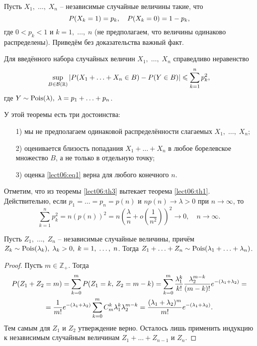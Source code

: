 Пусть $X_1,\;\ldots,\;X_n$ -- независимые случайные величины такие, что 
\[ \P(X_k=1)=p_k,\quad\P(X_k=0)=1-p_k, \]
где $0<p_k<1$ и $k=1,\;\ldots,\;n$ (не предполагаем, что величины одинаково распределены). Приведём без доказательства важный факт.

\begin{theorem}\label{lect06:th3}
Для введённого набора случайных величин $X_1,\;\ldots,\;X_n$ справедливо неравенство
\begin{equation}\label{lect06:eq1}
\sup_{B\in\mathcal{B}(\R)}\left|\P(X_1+\ldots+X_n\in B)-\P(Y\in B)\right|\leqslant\sum_{k=1}^np_k^2,
\end{equation}
где $Y\sim\textnormal{Pois}(\lambda),\;\lambda=p_1+\ldots+p_n$. 
\end{theorem}

\begin{nb}\label{lect06:nb2}
У этой теоремы есть три достоинства:
\begin{enumerate}
\item[1)] мы не предполагаем одинаковой распределённости слагаемых $X_1,\;\ldots,\;X_n;$
\item[2)] оценивается близость попадания $X_1+\ldots+X_n$ в любое борелевское множество $B$, а не только в отдельную точку;
\item[3)] оценка \ref{lect06:eq1} верна для любого конечного $n$.
\end{enumerate}
\end{nb}

Отметим, что из теоремы \ref{lect06:th3} вытекает теорема \ref{lect06:th1}. Действительно, если $p_1=\ldots=p_n=p(n)$ и $np(n)\to\lambda>0$ при $n\to\infty$, то
\[ \sum_{k=1}^np_k^2=n(p(n))^2=n\left(\dfrac{\lambda}{n}+o\left(\dfrac{1}{n^2}\right)\right)^2\to 0,\quad n\to\infty. \]

\begin{lemma}\label{lect06:lemma1}
Пусть $Z_1,\;\ldots,\;Z_n$ -- независимые случайные величины, причём $Z_k\sim\textnormal{Pois}(\lambda_k),\;\lambda_k>0,\;k=1,\;\ldots,\;n$. Тогда $Z_1+\ldots+Z_n\sim\textnormal{Pois}(\lambda_1+\ldots+\lambda_n)$.
\end{lemma}
\begin{proof}
Пусть $m\in\mathbb{Z}_+$. Тогда
\begin{multline*}
\P(Z_1+Z_2=m)=\sum_{k=0}^m\P(Z_1=k,\,Z_2=m-k)=\sum_{k=0}^m\dfrac{\lambda_1^k}{k!}\dfrac{\lambda_2^{m-k}}{(m-k)!}e^{-(\lambda_1+\lambda_2)}=\\
=\dfrac{1}{m!}e^{-(\lambda_1+\lambda_2)}\sum_{k=0}^mC_m^k\lambda_1^k\lambda_2^{m-k}=\dfrac{(\lambda_1+\lambda_2)^m}{m!}e^{-(\lambda_1+\lambda_2)}. 
\end{multline*}
Тем самым для $Z_1$ и $Z_2$ утверждение верно. Осталось лишь применить индукцию к независимым случайным величинам $Z_1+\ldots+Z_{n-1}$ и $Z_n$.
\end{proof}

